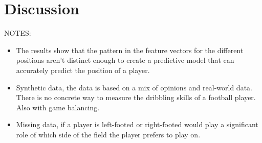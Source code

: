 \section{Discussion}

NOTES:
\begin{itemize}
    \item The results show that the pattern in the feature vectors for the different positions aren't distinct enough to create a predictive model that can accurately predict the position of a player.
    \item Synthetic data, the data is based on a mix of opinions and real-world data. There is no concrete way to measure the dribbling skills of a football player. Also with game balancing.
    \item Missing data, if a player is left-footed or right-footed would play a significant role of which side of the field the player prefers to play on.
\end{itemize}